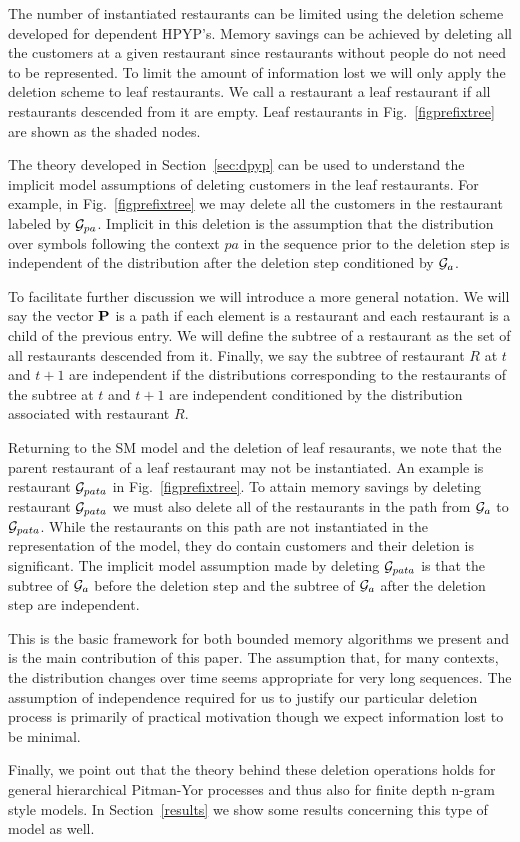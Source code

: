 The number of instantiated restaurants can be limited using the deletion scheme developed for dependent HPYP's. Memory savings can be achieved by deleting all the customers at a given restaurant since restaurants without people do not need to be represented.  To limit the amount of information lost we will only apply the deletion scheme to leaf restaurants. We call a restaurant a leaf restaurant if all restaurants descended from it are empty. Leaf restaurants in Fig.~\ref{figprefixtree} are shown as the shaded nodes. 

The theory developed in Section~\ref{sec:dpyp} can be used to understand the implicit model assumptions of deleting customers in the leaf restaurants. For example, in Fig.~\ref{figprefixtree} we may delete all the customers in the restaurant labeled by $\G_{pa}$.  Implicit in this deletion is the assumption that the distribution over symbols following the context $pa$ in the sequence prior to the deletion step is independent of the distribution after the deletion step conditioned by $\G_a$.

To facilitate further discussion we will introduce a more general notation.  We will say the vector $\bf{P}$ is a path if each element is a restaurant and each restaurant is a child of the previous entry.  We will define the subtree of a restaurant as the set of all restaurants descended from it.  Finally, we say the subtree of restaurant $R$ at $t$ and $t+1$ are independent if the distributions corresponding to the restaurants of the subtree at $t$ and $t+1$ are independent conditioned by the distribution associated with restaurant $R$.

Returning to the SM model and the deletion of leaf resaurants, we note that the parent restaurant of a leaf restaurant may not be instantiated.  An example is restaurant $\G_{pata}$ in Fig.~\ref{figprefixtree}. To attain memory savings by deleting restaurant $\G_{pata}$ we must also delete all of the restaurants in the path from $\G_a$ to $\G_{pata}$.  While the restaurants on this path are not instantiated in the representation of the model, they do contain customers and their deletion is significant.  The implicit model assumption made by deleting $\G_{pata}$ is that the subtree of $\G_a$ before the deletion step and the subtree of $\G_a$ after the deletion step are independent.

This is the basic framework for both bounded memory algorithms we present and is the main contribution of this paper.  The assumption that, for many contexts, the distribution changes over time seems appropriate for very long sequences. The assumption of independence required for us to justify our particular deletion process is primarily of practical motivation though we expect information lost to be minimal. 

Finally, we point out that the theory behind these deletion operations holds for general hierarchical Pitman-Yor processes and thus also for finite depth n-gram style models.  In Section~\ref{results} we show some results concerning this type of model as well.
